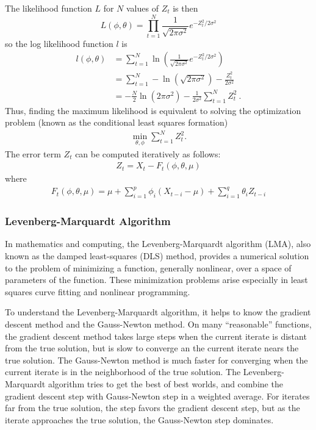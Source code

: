 The likelihood function $L$ for $N$ values of $Z_t$  is then
\begin{equation}
L(\phi, \theta) = \prod_{t = 1}^N  \frac{1}{\sqrt{2 \pi \sigma^2}} e^{-Z^2_t/2 \sigma^2}
\end{equation}
so the log likelihood function $l$ is
\begin{align}
l(\phi, \theta) &= \sum_{t = 1}^N \ln \left(\frac{1}{\sqrt{2 \pi \sigma^2}} e^{-Z^2_t/2 \sigma^2}
 \right) \nonumber\\
 &=  \sum_{t = 1}^N  - \ln \left( \sqrt{2 \pi \sigma^2}\right)  -\frac{Z^2_t}{2 \sigma^2}\nonumber\\
&=  -\frac{N}{2} \ln \left( 2 \pi \sigma^2\right)  - \frac{1}{2
  \sigma^2} \sum_{t = 1}^N   Z^2_t\ . \label{eq:loglikelihood}
\end{align}
Thus, finding the maximum likelihood is equivalent to solving the
optimization problem (known as the conditional least squares
formation) 
\begin{align}
\min_{\theta, \phi} \sum_{t = 1}^N  Z^2_t.
\end{align}
The error term $Z_t$ can be computed iteratively as follows:
\begin{align}\label{equ:error terms}
Z_t = X_t - F_t(\phi, \theta, \mu)
\end{align}
where 
\begin{align}
F_t(\phi, \theta, \mu) = \mu + \sum_{i=1}^p \phi_i (X_{t-i}-\mu) + \sum_{i=1}^q \theta_i Z_{t-i}
\end{align}

\subsubsection{Levenberg-Marquardt Algorithm}
In mathematics and computing, the Levenberg-Marquardt algorithm (LMA),
also known as the damped least-squares (DLS) method, provides a
numerical solution to the problem of minimizing a function, generally
nonlinear, over a space of parameters of the function. These
minimization problems arise especially in least squares curve fitting
and nonlinear programming. 

To understand the Levenberg-Marquardt algorithm, it helps to know the
gradient descent method and the Gauss-Newton method.  On many
``reasonable'' functions, the gradient descent method takes large
steps when the current iterate is distant from the true solution, but
is slow to converge an the current iterate nears the true solution.
The Gauss-Newton method is much faster for converging when the current
iterate is in the neighborhood of the true solution.  The
Levenberg-Marquardt algorithm tries to get the best of best worlds,
and combine the gradient descent step with Gauss-Newton step in a
weighted average.  For iterates far from the true solution, the step
favors the gradient descent step, but as the iterate approaches the
true solution, the Gauss-Newton step dominates.   

